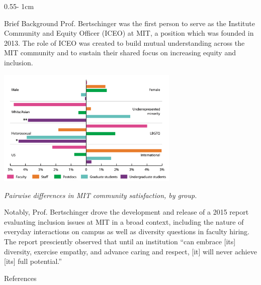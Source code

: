 \documentclass{../psuposter}
\begin{document}
\begin{frame}
\begin{columns}[t, totalwidth=\textwidth]
\begin{column}{0.55\textwidth - 1cm}
    \begin{block}{Brief Background}
    	Prof. Bertschinger was the first person to serve as the Institute Community and Equity Officer (ICEO) at MIT, a position which was founded in 2013. \cite{EdmundBertschingerAppointed} The role of ICEO was created to build mutual understanding across the MIT community and to sustain their shared focus on increasing equity and inclusion. \cite{InstituteCommunityEquity}    
        \begin{center}
		   	\includegraphics[width=0.65\textwidth]{images/background} 
		   	
		   	\textit{Pairwise differences in MIT community satisfaction, by group.}\cite{bertschingerAdvancingRespectfulCaring2015}
    	\end{center}
		
		Notably, Prof. Bertschinger drove the development and release of a 2015 report evaluating inclusion issues at MIT in a broad context, including the nature of everyday interactions on campus as well as diversity questions in faculty hiring. The report presciently observed that until an institution ``can embrace [its] diversity, exercise empathy, and advance caring and respect, [it] will never achieve [its] full potential.'' \cite{bertschingerAdvancingRespectfulCaring2015} 
    \end{block}


    \begin{block}{References}
        
%        
		
    \end{block}

\end{column}
\end{columns}



\end{frame}
\end{document}
